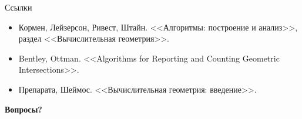 \documentclass{beamer}
\begin{document}
\begin{frame}{Ссылки}
\begin{itemize}
\item Кормен, Лейзерсон, Ривест, Штайн. <<Алгоритмы: построение и анализ>>, раздел <<Вычислительная геометрия>>.
\item Bentley, Ottman. <<Algorithms for Reporting and Counting Geometric Intersections>>.
\item Препарата, Шеймос. <<Вычислительная геометрия: введение>>.
\end{itemize}
\end{frame}

\begin{frame}
  \centerline{\huge{\textbf{Вопросы?}}}
\end{frame}
\end{document}
